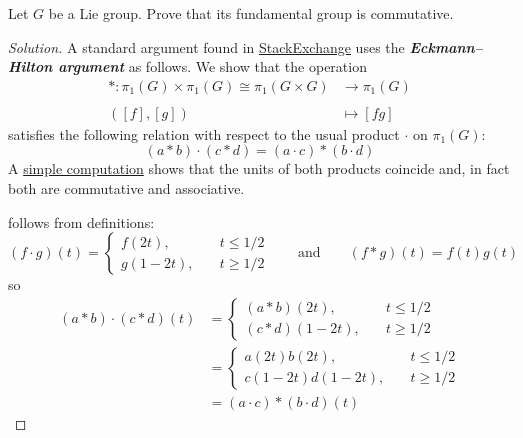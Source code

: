 \documentclass{article}
\begin{document}
\begin{exercise}
	Let $G$ be a Lie group. Prove that its fundamental group is commutative.
\end{exercise}
\begin{proof}[Solution]
	A standard argument found in \href{https://math.stackexchange.com/questions/727999/g-is-topological-implies-pi-1g-e-is-abelian}{StackExchange} uses the \textbf{\textit{Eckmann–Hilton argument}} as follows. We show that the operation
	\begin{align*}
		*:\pi_1(G)\times\pi_1(G)\cong\pi_1(G\times G)&\longrightarrow\pi_1(G)\\\\
		([f],[g])\qquad\qquad&\mapsto[fg]
	\end{align*}
	satisfies the following relation with respect to the usual product $\cdot$ on $\pi_1(G)$:
	\begin{equation}\label{eq:eck}
		(a*b)\cdot(c*d)=(a\cdot c)*(b\cdot d)
	\end{equation}
	A \href{https://en.wikipedia.org/wiki/Eckmann-Hilton_argument#Proof}{simple computation} shows that the units of both products coincide and, in fact both are commutative and associative.
	
	 follows from definitions:
	\[(f\cdot g)(t)=\begin{cases}
		f(2t), &t\leq 1/2\\
		g(1-2t),\quad &t\geq1/2
	\end{cases}\qquad\text{and}\qquad (f*g)(t)=f(t)g(t)\]
	so
	\begin{align*}
		(a*b)\cdot(c*d)(t)&=\begin{cases}
			(a*b)(2t), &t\leq 1/2\\
			(c*d)(1-2t),\quad &t\geq1/2
		\end{cases}\\
		&=\begin{cases}
			a(2t)b(2t), &t\leq 1/2\\
			c(1-2t)d(1-2t),\quad &t\geq1/2
		\end{cases}\\
		&=(a\cdot c)*(b\cdot d)(t)
	\end{align*}
\end{proof}
\end{document}
